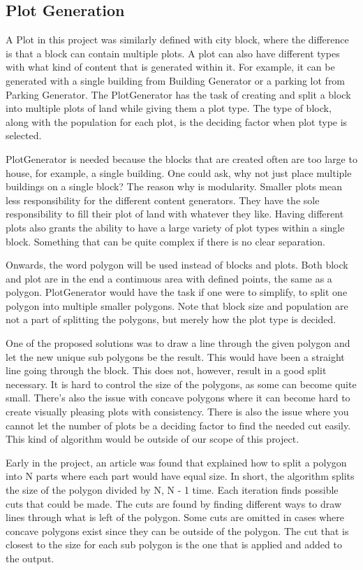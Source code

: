 \subsection{Plot Generation}
A Plot in this project was similarly defined with city block, where the difference is that a block can contain multiple plots. 
A plot can also have different types with what kind of content that is generated within it. 
For example, it can be generated with a single building from Building Generator or a parking lot from Parking Generator. 
The PlotGenerator has the task of creating and split a block into multiple plots of land while giving them a plot type. 
The type of block, along with the population for each plot, is the deciding factor when plot type is selected. 

PlotGenerator is needed because the blocks that are created often are too large to house, for example, a single building.
One could ask, why not just place multiple buildings on a single block? 
The reason why is modularity. 
Smaller plots mean less responsibility for the different content generators. 
They have the sole responsibility to fill their plot of land with whatever they like. 
Having different plots also grants the ability to have a large variety of plot types within a single block. 
Something that can be quite complex if there is no clear separation.

Onwards, the word polygon will be used instead of blocks and plots. 
Both block and plot are in the end a continuous area with defined points, the same as a polygon. 
PlotGenerator would have the task if one were to simplify, to split one polygon into multiple smaller polygons. 
Note that block size and population are not a part of splitting the polygons, but merely how the plot type is decided. 

One of the proposed solutions was to draw a line through the given polygon and let the new unique sub polygons be the result. 
This would have been a straight line going through the block. 
This does not, however, result in a good split necessary. 
It is hard to control the size of the polygons, as some can become quite small. 
There’s also the issue with concave polygons where it can become hard to create visually pleasing plots with consistency. 
There is also the issue where you cannot let the number of plots be a deciding factor to find the needed cut easily. 
This kind of algorithm would be outside of our scope of this project. 

Early in the project, an article was found that explained how to split a polygon into N parts where each part would have equal size. 
In short, the algorithm splits the size of the polygon divided by N, N - 1 time. 
Each iteration finds possible cuts that could be made. 
The cuts are found by finding different ways to draw lines through what is left of the polygon. 
Some cuts are omitted in cases where concave polygons exist since they can be outside of the polygon. 
The cut that is closest to the size for each sub polygon is the one that is applied and added to the output. 

